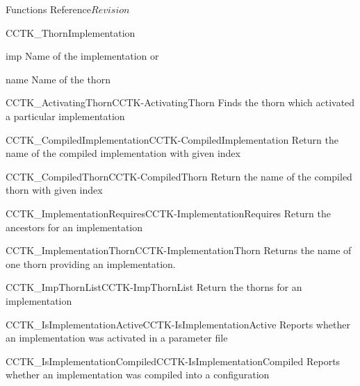 \begin{cactuspart}{ Functions Reference}{}{$Revision$}
\begin{FunctionDescription}{CCTK\_ThornImplementation}
\begin{ResultSection}
\begin{Result}{imp}
Name of the implementation or 
\end{Result}
\end{ResultSection}

\begin{ParameterSection}
\begin{Parameter}{name}
Name of the thorn
\end{Parameter}
\end{ParameterSection}


\begin{SeeAlsoSection}
\begin{SeeAlso2}{CCTK\_ActivatingThorn}{CCTK-ActivatingThorn}
  Finds the thorn which activated a particular implementation
\end{SeeAlso2}
\begin{SeeAlso2}{CCTK\_CompiledImplementation}{CCTK-CompiledImplementation}
  Return the name of the compiled implementation with given index
\end{SeeAlso2}
\begin{SeeAlso2}{CCTK\_CompiledThorn}{CCTK-CompiledThorn}
  Return the name of the compiled thorn with given index
\end{SeeAlso2}
\begin{SeeAlso2}{CCTK\_ImplementationRequires}{CCTK-ImplementationRequires}
  Return the ancestors for an implementation
\end{SeeAlso2}
\begin{SeeAlso2}{CCTK\_ImplementationThorn}{CCTK-ImplementationThorn}
  Returns the name of one thorn providing an implementation.
\end{SeeAlso2}
\begin{SeeAlso2}{CCTK\_ImpThornList}{CCTK-ImpThornList}
  Return the thorns for an implementation
\end{SeeAlso2}
\begin{SeeAlso2}{CCTK\_IsImplementationActive}{CCTK-IsImplementationActive}
  Reports whether an implementation was activated in a parameter file
\end{SeeAlso2}
\begin{SeeAlso2}{CCTK\_IsImplementationCompiled}{CCTK-IsImplementationCompiled}
  Reports whether an implementation was compiled into a configuration
\end{SeeAlso2}

\end{SeeAlsoSection}
\end{FunctionDescription}
\end{cactuspart}
